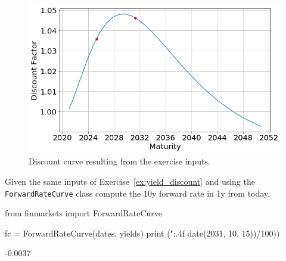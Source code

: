 \begin{solution}
\begin{figure}[htpb]
\centering
\includegraphics[width=0.7\linewidth]{figures/ex_discount}
\caption{Discount curve resulting from the exercise inputs.}
\label{fig:ex_discount}
\end{figure}
\end{solution}

%
%


\begin{question}
Given the same inputs of Exercise~\ref{ex:yield_discount} and using the \texttt{ForwardRateCurve} class compute the 10y forward rate in 1y from today. 
\end{question}

\cprotEnv\begin{solution}
\begin{ipython}
from finmarkets import ForwardRateCurve

fc = ForwardRateCurve(dates, yields)
print ("{:.4f}%
                                        date(2031, 10, 15))/100))
\end{ipython}
\begin{ioutput}
-0.0037%
\end{ioutput}
\end{solution}

